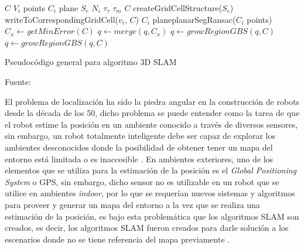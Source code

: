 \begin{algorithm}[H]
\centering
    \begin{algorithmic}[1]
        \Require $C$
        \Require $V_i$ points
        \Require $C_i$ plane
        \Require $S_c$
        \Require $N_i$
        \Require $\tau_\tau$
        \Require $\tau_m$
        \vspace{1mm}
        \hline
        \vspace{1mm}
        \State $C$ \leftarrow createGridCellStructure($S_c$)
            \State writeToCorrespondingGridCell($v_{i}$, $C$)
        \EndFor
            \State $C_i$ plane\leftarrow planarSegRansac($C_i$ points)
        \EndFor
            \State $C_x \leftarrow getMinError(C)$
            \State $q \leftarrow merge(q, C_x)$
            \State $q \leftarrow growRegionGBS(q, C)$
                \State $q \leftarrow growRegionGBS(q, C)$
            \EndWhile
        \EndWhile
        \vspace{1mm}
    \hline
    \vspace{1mm}
    \end{algorithmic}
\caption{Pseudocódigo general para algoritmo 3D SLAM }
Fuente: \cite{3dslam_2018}
\label{alg:Algoritmo 3DSLAM}
\end{algorithm}

El problema de localización ha sido la piedra angular en la construcción de robots desde la década de los 50, dicho problema se puede entender como la tarea de que el robot estime la posición en un ambiente conocido a través de diversos sensores, sin embargo, un robot totalmente inteligente debe ser capaz de explorar los ambientes desconocidos donde la posibilidad de obtener tener un mapa del entorno está limitada o es inaccesible \cite{taheri_slam_2021}. En ambientes exteriores, uno de los elementos que se utiliza para la estimación de la posición es el \textit{Global Positioning System} o GPS, sin embargo, dicho sensor no es utilizable en un robot que se utilice en ambientes \textit{indoor}, por lo que se requerían nuevos sistemas y algoritmos para proveer y generar un mapa del entorno a la vez que se realiza una estimación de la posición, es bajo esta problemática que los algoritmos SLAM son creados, es decir, los algoritmos SLAM fueron creados para darle solución a los escenarios donde no se tiene referencia del mapa previamente \cite{thrun_probabilistic_2005}.

